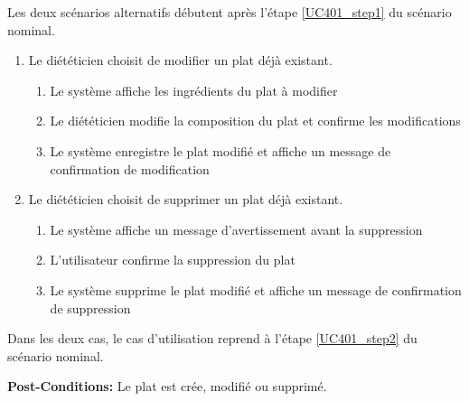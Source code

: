 Les deux scénarios alternatifs débutent après l'étape \ref{UC401_step1} du scénario nominal.
\begin{enumerate}
	\item Le diététicien choisit de modifier un plat déjà existant.
	\begin{enumerate}
		\item Le système affiche les ingrédients du plat à modifier
		\item Le diététicien modifie la composition du plat et confirme les modifications
		\item Le système enregistre le plat modifié et affiche un message de confirmation de modification
	\end{enumerate}
	\item Le diététicien choisit de supprimer un plat déjà existant.
	\begin{enumerate}
		\item Le système affiche un message d'avertissement avant la suppression
		\item L'utilisateur confirme la suppression du plat
		\item Le système supprime le plat modifié et affiche un message de confirmation de suppression
	\end{enumerate}
\end{enumerate}
Dans les deux cas, le cas d'utilisation reprend à l'étape \ref{UC401_step2} du scénario nominal.

\noindent \textbf{Post-Conditions:} Le plat est crée, modifié ou supprimé.

